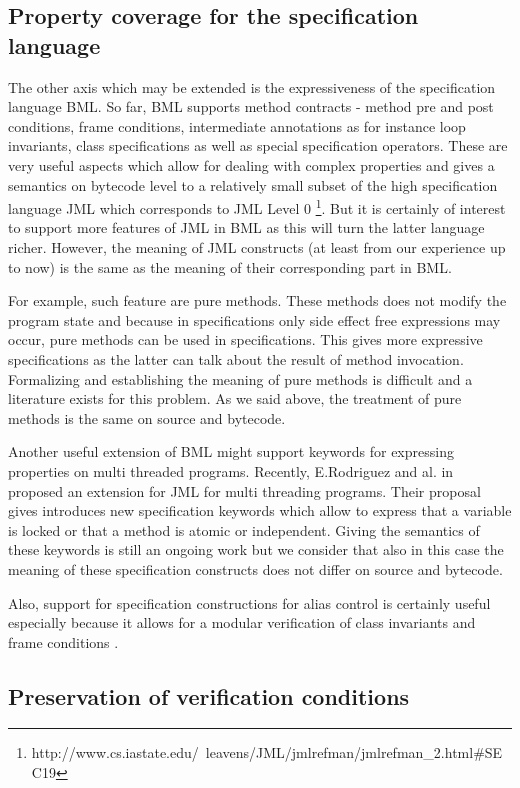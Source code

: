 \subsection{Property coverage for the specification language}
The other axis which may be extended is the expressiveness of the specification language BML. 
So far, BML supports method contracts - method pre and post  conditions, frame conditions, intermediate annotations as for instance
loop invariants, class specifications as well as special specification operators.
These are very useful aspects which allow for dealing with complex properties and 
gives a semantics on bytecode level  to a relatively small subset of the 
high specification language JML which corresponds to JML Level 0 \footnote{ http://www.cs.iastate.edu/~leavens/JML/jmlrefman/jmlrefman\_2.html\#SEC19}. 
 But it is certainly of interest to support more features of JML in BML
as this will turn the latter language richer. However, the meaning  of JML constructs 
(at least from our experience up to  now) is the same as the meaning of their corresponding part in BML.  

For example, such feature are  pure methods. These methods does not modify the program state and because in specifications only side effect free 
expressions may occur, pure methods can be used in specifications.
 This gives more expressive  specifications as the latter can talk about the result of method invocation. 
Formalizing and establishing the meaning of pure methods is difficult and a literature exists for this problem.
 As we said above, the treatment of pure methods is the same on source and bytecode.

Another useful extension of BML might support keywords for expressing properties on multi threaded programs.
Recently, E.Rodriguez and al. in \cite{RodriguezDFHLR05} proposed an extension for JML for multi threading programs.
 Their proposal gives introduces  new specification keywords which allow to express that a variable is locked or
 that a method is atomic or independent. Giving the semantics of these keywords is still an ongoing work but we consider that also in this
case the meaning of these specification constructs does not differ on source and bytecode. 

Also, support for specification constructions for alias control is certainly useful especially because it allows for a modular verification 
of class invariants and frame conditions \cite{}.
 
\subsection{Preservation of verification conditions}

